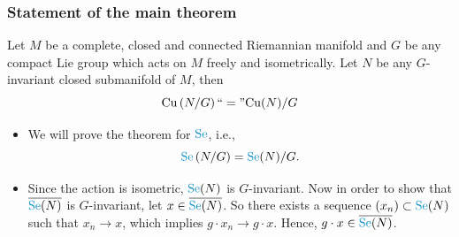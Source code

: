 \documentclass{beamer}
\begin{document}
	\begin{frame}
		\frametitle<presentation>{Statement of the main theorem}
		\p
		\begin{theorem}\label{thm:main_theorem}
			\p Let $M$ be a complete, \p closed \p and connected Riemannian manifold \p and $G$ be any compact Lie group which acts on $M$ \alert<6>{freely} and \alert<7>{isometrically}. \p[8]Let $N$ be any $G$-invariant closed submanifold of $M$, \p[9] then
			\begin{displaymath}
				\mathrm{Cu}\left(N/G\right) ``=" \mathrm{Cu}(N)/G	
			\end{displaymath}
		\end{theorem}
	\end{frame}	

	\begin{frame}
		\begin{itemize}
			\p \item We will prove the theorem for $\textcolor[HTML]{088ec4}{\mathrm{Se}}$, i.e., \p
		\begin{displaymath}
			\textcolor[HTML]{088ec4}{\mathrm{Se}} \left(N/G\right) = \textcolor[HTML]{088ec4}{\mathrm{Se}}(N)/G.
		\end{displaymath}
		\p \item Since the action is isometric, $\textcolor[HTML]{088ec4}{\mathrm{Se}}(N)$ is $G$-invariant. \p Now in order to show that $\overline{\textcolor[HTML]{088ec4}{\mathrm{Se}}(N)}$ is $G$-invariant, \p let $x\in \overline{\textcolor[HTML]{088ec4}{\mathrm{Se}}(N)}$. \p So there exists a sequence $(x_n)\subset \textcolor[HTML]{088ec4}{\mathrm{Se}}(N)$ such that $x_n\to x$, \p which implies $g\cdot x_n\to g\cdot x$. \p Hence, $g\cdot x \in \overline{\textcolor[HTML]{088ec4}{\mathrm{Se}}(N)}$.
		\end{itemize}
	\end{frame}	
\end{document}
